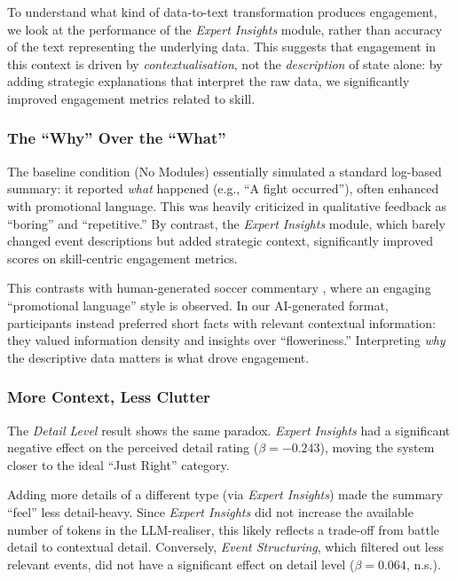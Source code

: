 To understand what kind of data-to-text transformation produces engagement, we look at the performance of the \textit{Expert Insights} module, rather than accuracy of the text representing the underlying data. This suggests that engagement in this context is driven by \textit{contextualisation}, not the \textit{description} of state alone: by adding strategic explanations that interpret the raw data, we significantly improved engagement metrics related to skill.

\subsubsection{The ``Why'' Over the ``What''}
The baseline condition (No Modules) essentially simulated a standard log-based summary: it reported \textit{what} happened (e.g., ``A fight occurred''), often enhanced with promotional language. This was heavily criticized in qualitative feedback as ``boring'' and ``repetitive.'' By contrast, the \textit{Expert Insights} module, which barely changed event descriptions but added strategic context, significantly improved scores on skill-centric engagement metrics.

This contrasts with human-generated soccer commentary \cite{lewandowski2012, pavzanin2022}, where an engaging ``promotional language'' style is observed. In our AI-generated format, participants instead preferred short facts with relevant contextual information: they valued information density and insights over ``floweriness.'' Interpreting \textit{why} the descriptive data matters is what drove engagement.

\subsubsection{More Context, Less Clutter}
The \textit{Detail Level} result shows the same paradox. \textit{Expert Insights} had a significant negative effect on the perceived detail rating ($\beta=-0.243$), moving the system closer to the ideal ``Just Right'' category.

Adding more details of a different type (via \textit{Expert Insights}) made the summary ``feel'' less detail-heavy. Since \textit{Expert Insights} did not increase the available number of tokens in the LLM-realiser, this likely reflects a trade-off from battle detail to contextual detail. Conversely, \textit{Event Structuring}, which filtered out less relevant events, did not have a significant effect on detail level ($\beta=0.064$, n.s.).

